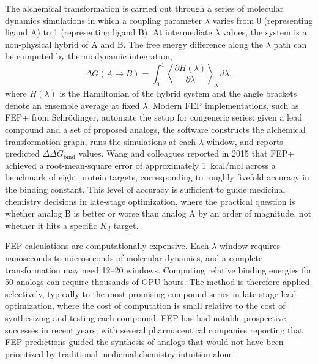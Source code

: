 The alchemical transformation is carried out through a series of molecular dynamics simulations in which a coupling parameter $\lambda$ varies from 0 (representing ligand A) to 1 (representing ligand B). At intermediate $\lambda$ values, the system is a non-physical hybrid of A and B. The free energy difference along the $\lambda$ path can be computed by thermodynamic integration,
\begin{equation}
  \label{eq:thermodynamic-integration}
  \Delta G(A \!\to\! B) = \int_0^1 \left\langle \frac{\partial H(\lambda)}{\partial \lambda} \right\rangle_\lambda \, d\lambda,
\end{equation}
where $H(\lambda)$ is the Hamiltonian of the hybrid system and the angle brackets denote an ensemble average at fixed $\lambda$. Modern FEP implementations, such as FEP+ from Schr\"odinger, automate the setup for congeneric series: given a lead compound and a set of proposed analogs, the software constructs the alchemical transformation graph, runs the simulations at each $\lambda$ window, and reports predicted $\Delta\Delta G_{\text{bind}}$ values. Wang and colleagues reported in 2015 that FEP+ achieved a root-mean-square error of approximately 1~kcal/mol across a benchmark of eight protein targets, corresponding to roughly fivefold accuracy in the binding constant. This level of accuracy is sufficient to guide medicinal chemistry decisions in late-stage optimization, where the practical question is whether analog B is better or worse than analog A by an order of magnitude, not whether it hits a specific $K_d$ target.

FEP calculations are computationally expensive. Each $\lambda$ window requires nanoseconds to microseconds of molecular dynamics, and a complete transformation may need 12--20 windows. Computing relative binding energies for 50 analogs can require thousands of GPU-hours. The method is therefore applied selectively, typically to the most promising compound series in late-stage lead optimization, where the cost of computation is small relative to the cost of synthesizing and testing each compound. FEP has had notable prospective successes in recent years, with several pharmaceutical companies reporting that FEP predictions guided the synthesis of analogs that would not have been prioritized by traditional medicinal chemistry intuition alone \cite{wang2015}.


